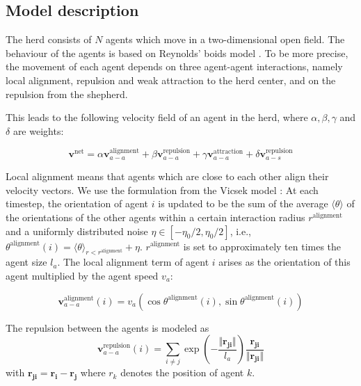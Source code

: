 \subsection{Model description}

The herd consists of $N$ agents which move in a two-dimensional open field. The behaviour of the agents is based on Reynolds' boids model \cite{boids}. To be more precise, the movement of each agent depends on three agent-agent interactions, namely local alignment, repulsion and weak attraction to the herd center, and on the repulsion from the shepherd.

This leads to the following velocity field of an agent in the herd, where $\alpha, \beta, \gamma$ and $\delta$ are weights:

\begin{equation}
\label{eq:agent_velocity}
\boldsymbol{v}^{\text{net}} = \alpha \boldsymbol{v}^{\text{alignment}}_{a-a} + \beta \boldsymbol{v}^{\text{repulsion}}_{a-a} + \gamma \boldsymbol{v}^{\text{attraction}}_{a-a} + \delta \boldsymbol{v}^{\text{repulsion}}_{a-s} 
\end{equation}

Local alignment means that agents which are close to each other align their velocity vectors. We use the formulation from the Vicsek model \cite{alignment}: At each timestep, the orientation of agent $i$ is updated to be the sum of the average $\langle \theta \rangle$ of the orientations of the other agents within a certain interaction radius $r^\text{alignment}$ and a uniformly distributed noise $\eta \in [-\eta_0 / 2, \eta_0 / 2]$, i.e., $\theta^\text{alignment}(i) = \langle \theta \rangle_{r < r^\text{alignment}} + \eta$. $r^\text{alignment}$ is set to approximately ten times the agent size $l_a$. The local alignment term of agent $i$ arises as the orientation of this agent multiplied by the agent speed $v_a$:

$$\boldsymbol{v}^{\text{alignment}}_{a-a}(i) = v_a 
 \left(\cos \theta^\text{alignment}(i), \sin\theta^\text{alignment}(i)\right)$$

The repulsion between the agents is modeled as
$$\boldsymbol{v}^{\text{repulsion}}_{a-a}(i) = \sum_{i \neq j} \exp\left( -\frac{\Vert\boldsymbol{r_{ji}}\Vert}{l_a}\right)\frac{\boldsymbol{r_{ji}}}{\Vert\boldsymbol{r_{ji}}\Vert}$$
with $\boldsymbol{r_{ji}} = \boldsymbol{r_i} - \boldsymbol{r_j}$ where $r_k$ denotes the position of agent $k$.

